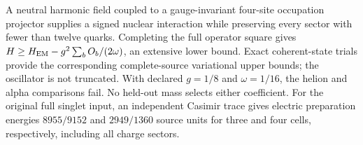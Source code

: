 A neutral harmonic field coupled to a gauge-invariant four-site occupation
projector supplies a signed nuclear interaction while preserving every
sector with fewer than twelve quarks. Completing the full operator square
gives \(H\geq H_{\rm EM}-g^2\sum_b O_b/(2\omega)\), an extensive lower
bound. Exact coherent-state trials provide the corresponding complete-source
variational upper bounds; the oscillator is not truncated. With declared
\(g=1/8\) and \(\omega=1/16\), the helion and alpha comparisons fail.
No held-out mass selects either coefficient. For the original full singlet
input, an independent Casimir trace gives electric preparation energies
\(8955/9152\) and \(2949/1360\) source units for three and four cells,
respectively, including all charge sectors.
